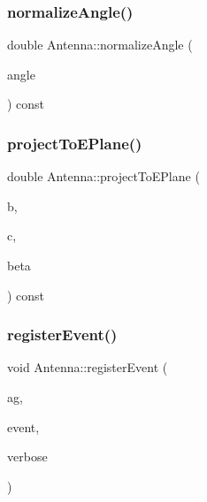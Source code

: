 \mbox{\label{class_antenna_a353ae3aafbc75033c30fb96004c2b73f}} 
\subsubsection{\texorpdfstring{normalize\+Angle()}{normalizeAngle()}}
{\footnotesize\ttfamily double Antenna\+::normalize\+Angle (\begin{DoxyParamCaption}\item[{double}]{angle }\end{DoxyParamCaption}) const\hspace{0.3cm}{\ttfamily [private]}}

\mbox{\label{class_antenna_a298c80a54828c8f13d584e8e382145a5}} 
\subsubsection{\texorpdfstring{project\+To\+E\+Plane()}{projectToEPlane()}}
{\footnotesize\ttfamily double Antenna\+::project\+To\+E\+Plane (\begin{DoxyParamCaption}\item[{double}]{b,  }\item[{double}]{c,  }\item[{double}]{beta }\end{DoxyParamCaption}) const\hspace{0.3cm}{\ttfamily [private]}}

\mbox{\label{class_antenna_aa21a4c0d581c59c36480d932584c0ef5}} 
\subsubsection{\texorpdfstring{register\+Event()}{registerEvent()}}
{\footnotesize\ttfamily void Antenna\+::register\+Event (\begin{DoxyParamCaption}\item[{\hyperlink{class_holdable_agent}{Holdable\+Agent} $\ast$}]{ag,  }\item[{const \hyperlink{_event_type_8h_a2628ea8d12e8b2563c32f05dc7fff6fa}{Event\+Type}}]{event,  }\item[{const bool}]{verbose }\end{DoxyParamCaption})\hspace{0.3cm}{\ttfamily [private]}}

